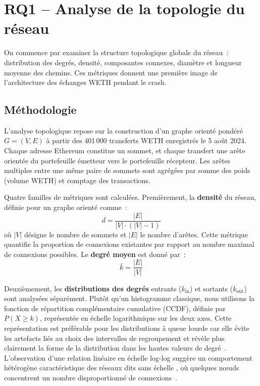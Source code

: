 
\section{RQ1 -- Analyse de la topologie du r\'eseau}
\label{sec:rq1}

On commence par examiner la structure topologique globale du r\'eseau~: distribution des degr\'es, densit\'e, composantes connexes, diam\`etre et longueur moyenne des chemins. Ces m\'etriques donnent une premi\`ere image de l'architecture des \'echanges WETH pendant le crash.

\subsection{M\'ethodologie}
\label{sec:rq1_methodo}

L'analyse topologique repose sur la construction d'un graphe orient\'e pond\'er\'e $G = (V, E)$ \`a partir des 401\,000 transferts WETH enregistr\'es le 5 ao\^ut 2024. Chaque adresse Ethereum constitue un sommet, et chaque transfert une ar\^ete orient\'ee du portefeuille \'emetteur vers le portefeuille r\'ecepteur. Les ar\^etes multiples entre une m\^eme paire de sommets sont agr\'eg\'ees par somme des poids (volume WETH) et comptage des transactions.

Quatre familles de m\'etriques sont calcul\'ees. Premi\`erement, la \textbf{densit\'e} du r\'eseau, d\'efinie pour un graphe orient\'e comme~:
\begin{equation}
d = \frac{|E|}{|V| \cdot (|V| - 1)}
\label{eq:density}
\end{equation}
o\`u $|V|$ d\'esigne le nombre de sommets et $|E|$ le nombre d'ar\^etes. Cette m\'etrique quantifie la proportion de connexions existantes par rapport au nombre maximal de connexions possibles. Le \textbf{degr\'e moyen} est donn\'e par~:
\begin{equation}
\bar{k} = \frac{|E|}{|V|}
\label{eq:avg_degree}
\end{equation}

Deuxi\`emement, les \textbf{distributions des degr\'es} entrants ($k_{\text{in}}$) et sortants ($k_{\text{out}}$) sont analys\'ees s\'epar\'ement. Plut\^ot qu'un histogramme classique, nous utilisons la fonction de r\'epartition compl\'ementaire cumulative (CCDF), d\'efinie par $P(X \geq k)$, repr\'esent\'ee en \'echelle logarithmique sur les deux axes. Cette repr\'esentation est pr\'ef\'erable pour les distributions \`a queue lourde car elle \'evite les artefacts li\'es au choix des intervalles de regroupement et r\'ev\`ele plus clairement la forme de la distribution dans les hautes valeurs de degr\'e~\cite{clauset2009powerlaw}. L'observation d'une relation lin\'eaire en \'echelle log-log sugg\`ere un comportement h\'et\'erog\`ene caract\'eristique des r\'eseaux dits \og sans \'echelle \fg{}, o\`u quelques n\oe{}uds concentrent un nombre disproportionn\'e de connexions~\cite{barabasi1999scalefree}.

